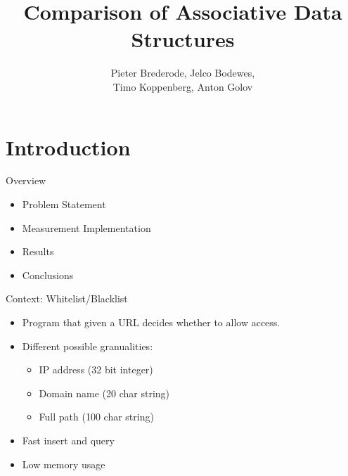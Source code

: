 \documentclass[10pt]{beamer}
\title{Comparison of Associative Data Structures}
\author{Pieter Brederode, Jelco Bodewes, \\ Timo Koppenberg, Anton Golov}
\institute{B3OMI}
\begin{document}
\begin{frame}
    \maketitle
\end{frame}


\section{Introduction}
\begin{frame}{Overview}
    \begin{itemize}
        \item Problem Statement
        \item Measurement Implementation
        \item Results
        \item Conclusions
    \end{itemize}
\end{frame}

\begin{frame}{Context: Whitelist/Blacklist}
    \begin{itemize}
        \item Program that given a URL decides whether to allow access.
        \item Different possible granualities:
        \begin{itemize}
            \item IP address (32 bit integer)
            \item Domain name (20 char string)
            \item Full path (100 char string)
        \end{itemize}
        \item Fast insert and query
        \item Low memory usage
    \end{itemize}
\end{frame}
\end{document}

